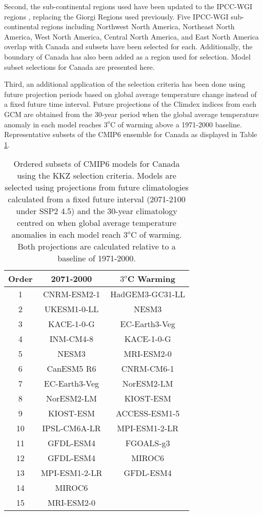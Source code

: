 \documentclass[]{scrartcl}
\begin{document}
Second, the sub-continental regions used have been updated to the IPCC-WGI regions \citep{Iturbide2020}, replacing the Giorgi Regions used previously. Five IPCC-WGI sub-continental regions including Northwest North America, Northeast North America, West North America, Central North America, and East North America overlap with Canada and subsets have been selected for each. Additionally, the boundary of Canada has also been added as a region used for selection. Model subset selections for Canada are presented here.

Third, an additional application of the selection criteria has been done using future projection periods based on global average temperature change instead of a fixed future time interval. Future projections of the Climdex indices from each GCM are obtained from the 30-year period when the global average temperature anomaly in each model reaches $3^o$C of warming above a 1971-2000 baseline. Representative subsets of the CMIP6 ensemble for Canada as displayed in Table \ref{table:can_subsets}. 


\begin{table}[ht!]
	\caption{Ordered subsets of CMIP6 models for Canada using the KKZ selection criteria. Models are selected using projections from future climatologies calculated from a fixed future interval (2071-2100 under SSP2 4.5) and the 30-year climatology centred on when global average temperature anomalies in each model reach $3^o$C of warming. Both projections are calculated relative to a baseline of 1971-2000. }\label{table:can_subsets}
	\begin{center}
		\begin{tabularx}{0.602\linewidth}{|c|c|c|}
			\hline
			\textbf{Order} & 2071-2000 & $3^o$C Warming \\
			\hline
			1 & CNRM-ESM2-1 & HadGEM3-GC31-LL \\
			2 & UKESM1-0-LL & NESM3 \\
			3 & KACE-1-0-G  & EC-Earth3-Veg \\
			4 & INM-CM4-8  & KACE-1-0-G \\
			5 & NESM3  & MRI-ESM2-0 \\
			6 & CanESM5 R6  & CNRM-CM6-1 \\
			7 & EC-Earth3-Veg  & NorESM2-LM \\
			8 & NorESM2-LM  & KIOST-ESM \\
			9 & KIOST-ESM  & ACCESS-ESM1-5 \\
			10 & IPSL-CM6A-LR  & MPI-ESM1-2-LR \\
			11 & GFDL-ESM4 & FGOALS-g3 \\
			12 & GFDL-ESM4  & MIROC6 \\
			13 & MPI-ESM1-2-LR  & GFDL-ESM4 \\
			14 & MIROC6  &  \\
			15 & MRI-ESM2-0 &  \\
			\hline
		\end{tabularx}
	\end{center}
\end{table}	
\end{document}
